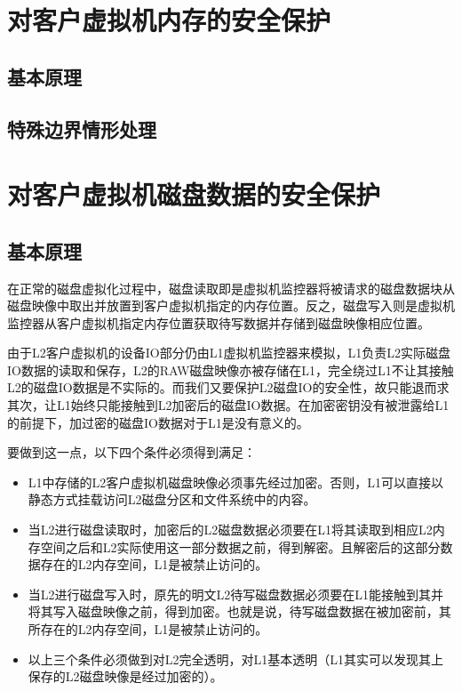 \section{对客户虚拟机内存的安全保护}



\subsection{基本原理}

\subsection{特殊边界情形处理}




\section{对客户虚拟机磁盘数据的安全保护}

\subsection{基本原理}

在正常的磁盘虚拟化过程中，磁盘读取即是虚拟机监控器将被请求的磁盘数据块从磁盘映像中取出并放置到客户虚拟机指定的内存位置。反之，磁盘写入则是虚拟机监控器从客户虚拟机指定内存位置获取待写数据并存储到磁盘映像相应位置。

由于L2客户虚拟机的设备IO部分仍由L1虚拟机监控器来模拟，L1负责L2实际磁盘IO数据的读取和保存，L2的RAW磁盘映像亦被存储在L1，完全绕过L1不让其接触L2的磁盘IO数据是不实际的。而我们又要保护L2磁盘IO的安全性，故只能退而求其次，让L1始终只能接触到L2加密后的磁盘IO数据。在加密密钥没有被泄露给L1的前提下，加过密的磁盘IO数据对于L1是没有意义的。

要做到这一点，以下四个条件必须得到满足：

\begin{itemize}
\item{L1中存储的L2客户虚拟机磁盘映像必须事先经过加密。否则，L1可以直接以静态方式挂载访问L2磁盘分区和文件系统中的内容。}
\item{当L2进行磁盘读取时，加密后的L2磁盘数据必须要在L1将其读取到相应L2内存空间之后和L2实际使用这一部分数据之前，得到解密。且解密后的这部分数据存在的L2内存空间，L1是被禁止访问的。}
\item{当L2进行磁盘写入时，原先的明文L2待写磁盘数据必须要在L1能接触到其并将其写入磁盘映像之前，得到加密。也就是说，待写磁盘数据在被加密前，其所存在的L2内存空间，L1是被禁止访问的。}
\item{以上三个条件必须做到对L2完全透明，对L1基本透明（L1其实可以发现其上保存的L2磁盘映像是经过加密的）。}
\end{itemize}

